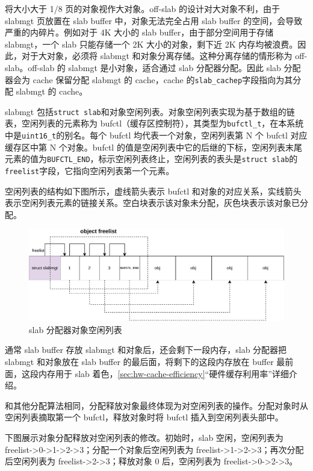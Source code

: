 \documentclass[AutoFakeBold]{LZUThesis}
\begin{document}
\begin{sloppypar}
将大小大于 1/8 页的对象视作大对象。off-slab 的设计对大对象不利，由于
slabmgt 页放置在 slab buffer 中，对象无法完全占用 slab buffer
的空间，会导致严重的内碎片。例如对于 4K 大小的 slab
buffer，由于部分空间用于存储 slabmgt，一个 slab 只能存储一个 2K
大小的对象，剩下近 2K 内存均被浪费。因此，对于大对象，必须将 slabmgt
和对象分离存储。这种分离存储的情形称为 off-slab。off-slab 的 slabmgt
是小对象，适合通过 slab 分配器分配。因此 slab 分配器会为 cache 保留分配
slabmgt 的 cache，cache 的\texttt{slab\_cachep}字段指向为其分配 slabmgt
的 cache。

slabmgt
包括\texttt{struct\ slab}和对象空闲列表。对象空闲列表实现为基于数组的链表，空闲列表的元素称为
bufctl（缓存区控制符），其类型为\texttt{bufctl\_t}，在本系统中是\texttt{uint16\_t}的别名。每个
bufctl 均代表一个对象，空闲列表第 N 个 bufctl 对应缓存区中第 N
个对象。bufctl
的值是空闲列表中它的后继的下标，空闲列表末尾元素的值为\texttt{BUFCTL\_END}，标示空闲列表终止，空闲列表的表头是\texttt{struct\ slab}的\texttt{freelist}字段，它指向空闲列表第一个元素。

空闲列表的结构如下图所示，虚线箭头表示 bufctl
和对象的对应关系，实线箭头表示空闲列表元素的链接关系。空白块表示该对象未分配，灰色块表示该对象已分配。

\begin{figure}[htb]
\centering
\includegraphics[scale=0.8]{images/freelist-management.drawio.pdf}
\caption{slab 分配器对象空闲列表}
\end{figure}

通常 slab buffer 存放 slabmgt 和对象后，还会剩下一段内存，slab 分配器把
slabmgt 和对象放在 slab buffer 的最后面，将剩下的这段内存放在 buffer
最前面，这段内存用于 slab 着色，\ref{sec:hw-cache-efficiency}“硬件缓存利用率”详细介绍。

和其他分配算法相同，分配释放对象最终体现为对空闲列表的操作。分配对象时从空闲列表摘取第一个
bufctl，释放对象时将 bufctl 插入到空闲列表头部中。

下图展示对象分配释放对空闲列表的修改。初始时，slab 空闲，空闲列表为
freelist-\textgreater0-\textgreater1-\textgreater2-\textgreater3；分配一个对象后空闲列表为
freelist-\textgreater1-\textgreater2-\textgreater3；再次分配后空闲列表为
freelist-\textgreater2-\textgreater3；释放对象 0 后，空闲列表为
freelist-\textgreater0-\textgreater2-\textgreater3。


\end{sloppypar}
\end{document}
